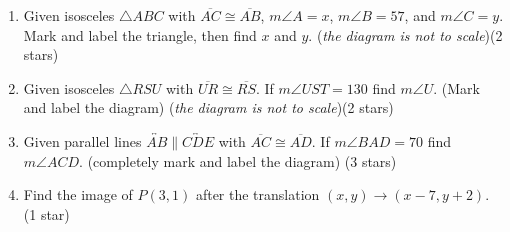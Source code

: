 \documentclass[12pt, twoside]{article}
\begin{document}
\begin{enumerate}
\newpage
\item Given isosceles $\triangle ABC$ with $\overline{AC} \cong \overline{AB}$, $m\angle A = x$, $m\angle B = 57$, and $m\angle C=y$. Mark and label the triangle, then find $x$ and $y$. \hfill (\emph{the diagram is not to scale})(2 stars)
  \begin{flushright}
  \end{flushright}

\item Given isosceles $\triangle RSU$ with $\overline{UR} \cong \overline{RS}$. If $m\angle UST=130$ find $m\angle U$. (Mark and label the diagram) \hfill (\emph{the diagram is not to scale})(2 stars)
  \begin{flushright}
  \end{flushright} \vspace{1cm}

\item Given parallel lines $\overleftrightarrow{AB} \parallel \overleftrightarrow{CDE}$ with $\overline{AC} \cong \overline{AD}$. If $m\angle BAD=70$ find $m\angle ACD$. (completely mark and label the diagram) \hfill (3 stars)
    \begin{flushright}
    \end{flushright} \vspace{1.5cm}

\newpage

\item Find the image of $P(3,1)$ after the translation $(x,y) \rightarrow (x-7,y+2)$. \hfill (1 star) \vspace{2cm}


\end{enumerate}
\end{document}
